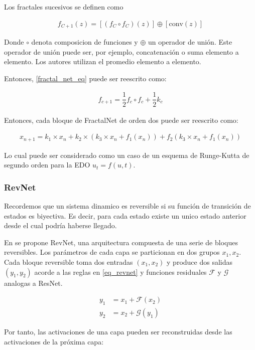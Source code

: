 \documentclass[titlepage,a4paper,oneside]{article}
\begin{document}
Los fractales sucesivos se definen como

\begin{align}\label{fractal_net_eq}
	f_{C+1}(z) = \left[ (f_C \circ f_C)(z) \right] \oplus \left[ \text{conv}(z) \right]
\end{align}

Donde $\circ$ denota composicion de funciones y $\oplus$ un operador de unión. Este operador de unión puede ser, por ejemplo, concatenación o suma elemento a elemento. Los autores utilizan el promedio elemento a elemento.

Entonces, \ref{fractal_net_eq} puede ser reescrito como:

\begin{align}
	f_{c+1} = \dfrac{1}{2} f_c \circ f_c + \dfrac{1}{2} k_c
\end{align}

Entonces, cada bloque de FractalNet de orden dos puede ser reescrito como:

\begin{align}
	x_{n+1} = k_1 \times x_n + k_2 \times (k_3 \times x_n + f_1(x_n)) + f_2 (k_3 \times x_n + f_1(x_n))
\end{align}

Lo cual puede ser considerado como un caso de un esquema de Runge-Kutta de segundo orden para la EDO $u_t = f(u,t)$.

\subsubsection{RevNet}
Recordemos que un sistema dinamico es reversible si su función de transición de estados es biyectiva. Es decir, para cada estado existe un unico estado anterior desde el cual podría haberse llegado.

En \cite{gomez2017reversible} se propone RevNet, una arquitectura compuesta de una serie de bloques reversibles. Los parámetros de cada capa se particionan en dos grupos $x_1, x_2$. Cada bloque reversible toma dos entradas $(x_1, x_2)$ y produce dos salidas $(y_1, y_2)$ acorde a las reglas en \ref{eq_revnet} y funciones residuales $\mathscr{F}$ y $\mathscr{G}$ analogas a ResNet.

\begin{align}\label{eq_revnet}
	y_1 &= x_1 + \mathscr{F}(x_2) \\
	y_2 &= x_2 + \mathscr{G}(y_1)
\end{align}

Por tanto, las activaciones de una capa pueden ser reconstruidas desde las activaciones de la próxima capa:
\end{document}
